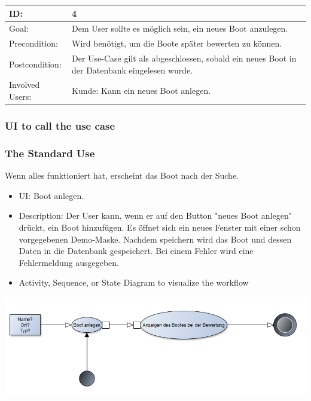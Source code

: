 \documentclass[12pt]{article}
\theoremstyle{definition}
\begin{document}
\begin{tabular}{|p{.2\linewidth}|p{.65\linewidth}|}
\hline 
ID: & 4 \\ \hline
Goal: & Dem User sollte es möglich sein, ein neues Boot anzulegen. \\ \hline
Precondition: & Wird benötigt, um die Boote später bewerten zu können. \\ \hline
Postcondition: & Der Use-Case gilt als abgeschlossen, sobald ein neues Boot in der Datenbank eingelesen wurde.\\ \hline
Involved Users: &Kunde: Kann ein neues Boot anlegen. \\ \hline
\end{tabular}

\subsubsection{UI to call the use case}

\subsubsection{The Standard Use}
Wenn alles funktioniert hat, erscheint das Boot nach der Suche.
\begin{itemize}
	\item UI: Boot anlegen.
	\item Description: Der User kann, wenn er auf den Button "neues Boot anlegen" drückt, ein Boot hinzufügen. Es öffnet sich ein neues Fenster mit einer schon vorgegebenen Demo-Maske. 
	Nachdem speichern wird das Boot und dessen Daten in die Datenbank gespeichert. Bei einem Fehler wird eine Fehlermeldung ausgegeben.
	\item Activity, Sequence, or State Diagram to visualize the workflow
\end{itemize}
\includegraphics[height=0.40\textwidth]{Boot_anlegen.PNG}
\end{document}
